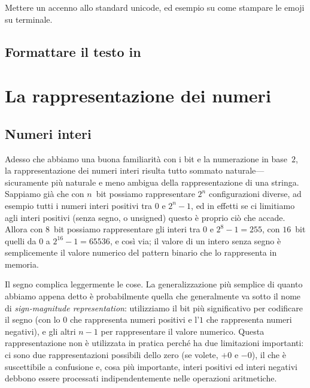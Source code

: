 Mettere un accenno allo standard unicode, ed esempio su come stampare le emoji su
terminale.



\subsection{Formattare il testo in \python}


\section{La rappresentazione dei numeri}


\subsection{Numeri interi}
\label{sec:rappresentazione_interi}

Adesso che abbiamo una buona familiarit\`a con i bit e la numerazione in base~$2$,
la rappresentazione dei numeri interi risulta tutto sommato naturale---sicuramente
pi\`u naturale e meno ambigua della rappresentazione di una stringa. Sappiamo gi\`a
che con $n$~bit possiamo rappresentare $2^n$ configurazioni diverse, ad esempio tutti
i numeri interi positivi tra $0$ e $2^n - 1$, ed in effetti se ci limitiamo agli
interi positivi (senza segno, o unsigned) questo \`e proprio ci\`o che accade.
Allora con $8$~bit possiamo rappresentare gli interi tra $0$ e $2^8 - 1 = 255$,
con $16$~bit quelli da $0$ a $2^{16} - 1 = 65536$, e cos\`i via; il valore di un
intero senza segno \`e semplicemente il valore numerico del pattern binario che lo
rappresenta in memoria.

Il segno complica leggermente le cose. La generalizzazione pi\`u semplice di quanto
abbiamo appena detto \`e probabilmente quella che generalmente va sotto il nome di
\emph{sign-magnitude representation}: utilizziamo il bit pi\`u significativo per
codificare il segno (con lo $0$ che rappresenta numeri positivi e l'$1$ che rappresenta
numeri negativi), e gli altri $n - 1$ per rappresentare il valore numerico. Questa
rappresentazione non \`e utilizzata in pratica perch\'e ha due limitazioni importanti:
ci sono due rappresentazioni possibili dello zero (se volete, $+0$ e $-0$), il che
\`e suscettibile a confusione e, cosa pi\`u importante, interi positivi ed interi
negativi debbono essere processati indipendentemente nelle operazioni aritmetiche.

